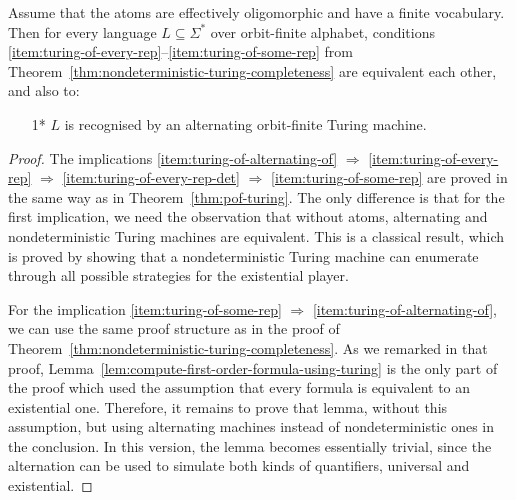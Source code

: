 \begin{theorem}\label{thm:alternating-turing-completeness}
	Assume that the atoms are effectively oligomorphic and have a finite vocabulary.  Then for  every language $L \subseteq \Sigma^*$ over  orbit-finite alphabet, conditions \ref{item:turing-of-every-rep}--\ref{item:turing-of-some-rep} from Theorem~\ref{thm:nondeterministic-turing-completeness} are equivalent each other, and also to:
    \begin{enumerate}
        \item[1*]  $L$ is recognised by an alternating orbit-finite  Turing machine.
    \end{enumerate}
\end{theorem}
\begin{proof}
	The implications  \ref{item:turing-of-alternating-of} $\Rightarrow$ \ref{item:turing-of-every-rep} $\Rightarrow$ \ref{item:turing-of-every-rep-det} $\Rightarrow$ \ref{item:turing-of-some-rep} are proved in the same way as in Theorem~\ref{thm:pof-turing}. The only difference is that for the first implication, we need the observation that without atoms, alternating and nondeterministic Turing machines are equivalent. This is a classical result, which is proved by showing that a nondeterministic Turing machine can enumerate through all possible strategies for the existential player.

	For the implication \ref{item:turing-of-some-rep} $\Rightarrow$ \ref{item:turing-of-alternating-of}, we can use the same proof structure as in the proof of Theorem~\ref{thm:nondeterministic-turing-completeness}. As we remarked in that proof, Lemma~\ref{lem:compute-first-order-formula-using-turing} is the only part of the proof which used the assumption that every formula is equivalent to an existential one. Therefore, it remains to prove that lemma, without this assumption, but using alternating machines instead of nondeterministic ones in the conclusion. In this version, the lemma becomes essentially trivial, since the alternation can be used to simulate both kinds of quantifiers, universal and existential.
\end{proof}


\exercisepart


